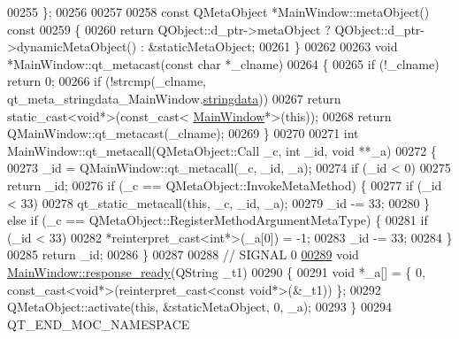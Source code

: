 \begin{DoxyCode}
00255 \};
00256 
00257 
00258 \textcolor{keyword}{const} QMetaObject *MainWindow::metaObject()\textcolor{keyword}{ const}
00259 \textcolor{keyword}{}\{
00260     \textcolor{keywordflow}{return} QObject::d\_ptr->metaObject ? QObject::d\_ptr->dynamicMetaObject() : &staticMetaObject;
00261 \}
00262 
00263 \textcolor{keywordtype}{void} *MainWindow::qt\_metacast(\textcolor{keyword}{const} \textcolor{keywordtype}{char} *\_clname)
00264 \{
00265     \textcolor{keywordflow}{if} (!\_clname) \textcolor{keywordflow}{return} 0;
00266     \textcolor{keywordflow}{if} (!strcmp(\_clname, qt\_meta\_stringdata\_MainWindow.\hyperlink{a00015_aa581d4bebf76b40e9469596766315411}{stringdata}))
00267         \textcolor{keywordflow}{return} \textcolor{keyword}{static\_cast<}\textcolor{keywordtype}{void}*\textcolor{keyword}{>}(\textcolor{keyword}{const\_cast<} \hyperlink{a00006}{MainWindow}*\textcolor{keyword}{>}(\textcolor{keyword}{this}));
00268     \textcolor{keywordflow}{return} QMainWindow::qt\_metacast(\_clname);
00269 \}
00270 
00271 \textcolor{keywordtype}{int} MainWindow::qt\_metacall(QMetaObject::Call \_c, \textcolor{keywordtype}{int} \_id, \textcolor{keywordtype}{void} **\_a)
00272 \{
00273     \_id = QMainWindow::qt\_metacall(\_c, \_id, \_a);
00274     \textcolor{keywordflow}{if} (\_id < 0)
00275         \textcolor{keywordflow}{return} \_id;
00276     \textcolor{keywordflow}{if} (\_c == QMetaObject::InvokeMetaMethod) \{
00277         \textcolor{keywordflow}{if} (\_id < 33)
00278             qt\_static\_metacall(\textcolor{keyword}{this}, \_c, \_id, \_a);
00279         \_id -= 33;
00280     \} \textcolor{keywordflow}{else} \textcolor{keywordflow}{if} (\_c == QMetaObject::RegisterMethodArgumentMetaType) \{
00281         \textcolor{keywordflow}{if} (\_id < 33)
00282             *\textcolor{keyword}{reinterpret\_cast<}\textcolor{keywordtype}{int}*\textcolor{keyword}{>}(\_a[0]) = -1;
00283         \_id -= 33;
00284     \}
00285     \textcolor{keywordflow}{return} \_id;
00286 \}
00287 
00288 \textcolor{comment}{// SIGNAL 0}
\hypertarget{a00015_source_l00289}{}\hyperlink{a00006_a3f6396874778799cf07a7a0149e54977}{00289} \textcolor{keywordtype}{void} \hyperlink{a00006_a3f6396874778799cf07a7a0149e54977}{MainWindow::response\_ready}(QString \_t1)
00290 \{
00291     \textcolor{keywordtype}{void} *\_a[] = \{ 0, \textcolor{keyword}{const\_cast<}\textcolor{keywordtype}{void}*\textcolor{keyword}{>}(\textcolor{keyword}{reinterpret\_cast<}\textcolor{keyword}{const }\textcolor{keywordtype}{void}*\textcolor{keyword}{>}(&\_t1)) \};
00292     QMetaObject::activate(\textcolor{keyword}{this}, &staticMetaObject, 0, \_a);
00293 \}
00294 QT\_END\_MOC\_NAMESPACE
\end{DoxyCode}
